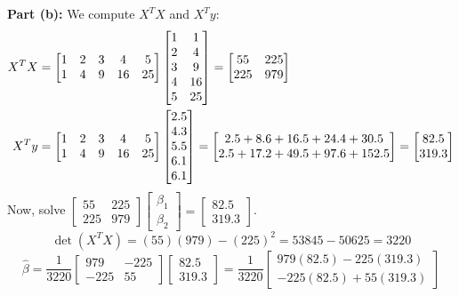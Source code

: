 \documentclass[11pt, letterpaper]{article}
\theoremstyle{definition}
\theoremstyle{remark}
\begin{document}
\textbf{Part (b):} We compute $X^T X$ and $X^T y$:
\begin{align*}
X^T X &= \begin{bmatrix} 1 & 2 & 3 & 4 & 5 \\ 1 & 4 & 9 & 16 & 25 \end{bmatrix} \begin{bmatrix} 1 & 1 \\ 2 & 4 \\ 3 & 9 \\ 4 & 16 \\ 5 & 25 \end{bmatrix} = \begin{bmatrix} 55 & 225 \\ 225 & 979 \end{bmatrix} \\ \relax
X^T y &= \begin{bmatrix} 1 & 2 & 3 & 4 & 5 \\ 1 & 4 & 9 & 16 & 25 \end{bmatrix} \begin{bmatrix} 2.5 \\ 4.3 \\ 5.5 \\ 6.1 \\ 6.1 \end{bmatrix} = \begin{bmatrix} 2.5 + 8.6 + 16.5 + 24.4 + 30.5 \\ 2.5 + 17.2 + 49.5 + 97.6 + 152.5 \end{bmatrix} = \begin{bmatrix} 82.5 \\ 319.3 \end{bmatrix}
\end{align*}
Now, solve $\begin{bmatrix} 55 & 225 \\ 225 & 979 \end{bmatrix} \begin{bmatrix} \beta_1 \\ \beta_2 \end{bmatrix} = \begin{bmatrix} 82.5 \\ 319.3 \end{bmatrix}$.
\[
\det(X^T X) = (55)(979) - (225)^2 = 53845 - 50625 = 3220
\]
\[
\hat{\beta} = \frac{1}{3220} \begin{bmatrix} 979 & -225 \\ -225 & 55 \end{bmatrix} \begin{bmatrix} 82.5 \\ 319.3 \end{bmatrix} = \frac{1}{3220} \begin{bmatrix} 979(82.5) - 225(319.3) \\ -225(82.5) + 55(319.3) \end{bmatrix}
\]
\end{document}
